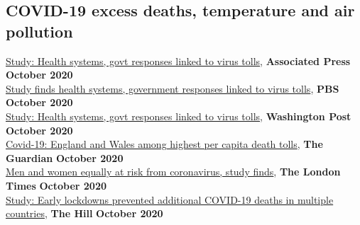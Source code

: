 \subsection*{COVID-19 excess deaths, temperature and air pollution}

\href{https://apnews.com/article/virus-outbreak-pandemics-public-health-disease-outbreaks-europe-acf6b710cab51381a05a4e1b5fc9c931}{Study: Health systems, govt responses linked to virus tolls}, \textbf{Associated Press} \hfill \textbf{October 2020}\\
\href{https://www.pbs.org/newshour/health/study-finds-health-systems-government-responses-linked-to-virus-tolls}{Study finds health systems, government responses linked to virus tolls}, \textbf{PBS} \hfill \textbf{October 2020}\\
\href{https://www.washingtonpost.com/world/europe/study-health-systems-govt-responses-linked-to-virus-tolls/2020/10/14/4c3b2d46-0e19-11eb-b404-8d1e675ec701_story.html}{Study: Health systems, govt responses linked to virus tolls}, \textbf{Washington Post} \hfill \textbf{October 2020}\\
\href{https://www.theguardian.com/world/2020/oct/14/covid-19-england-and-wales-among-highest-per-capita-death-tolls?utm_term=Autofeed&CMP=twt_gu&utm_medium&utm_source=Twitter#Echobox=1602667525}{Covid-19: England and Wales among highest per capita death tolls}, \textbf{The Guardian} \hfill \textbf{October 2020}\\
\href{https://www.thetimes.co.uk/edition/news/men-and-women-equally-at-risk-from-pandemic-study-finds-28rnppfjj?utm_medium=Social&utm_source=Twitter#Echobox=1602673857}{Men and women equally at risk from coronavirus, study finds}, \textbf{The London Times} \hfill \textbf{October 2020}\\
\href{https://thehill.com/policy/healthcare/legal-challenges/520992-study-early-lockdowns-prevented-additional-covid-19-deaths}{Study: Early lockdowns prevented additional COVID-19 deaths in multiple countries}, \textbf{The Hill} \hfill \textbf{October 2020}
